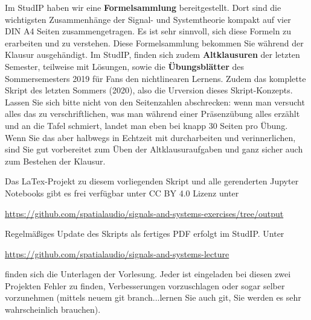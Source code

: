 Im StudIP haben wir eine \textbf{Formelsammlung} bereitgestellt. Dort sind die
wichtigsten Zusammenhänge der Signal- und Systemtheorie kompakt auf vier DIN A4
Seiten zusammengetragen. Es ist sehr sinnvoll, sich diese Formeln zu erarbeiten
und zu verstehen. Diese Formelsammlung bekommen Sie während der Klausur ausgehändigt.
%
Im StudIP, finden sich zudem \textbf{Altklausuren} der letzten Semester,
teilweise mit Lösungen, sowie die \textbf{Übungsblätter} des
Sommersemesters 2019 für Fans den nichtlinearen Lernens. Zudem das komplette Skript des letzten Sommers (2020), also die Urversion dieses Skript-Konzepts.
Lassen Sie sich bitte nicht von den Seitenzahlen abschrecken: wenn man versucht
alles das zu verschriftlichen, was man während einer Präsenzübung alles erzählt
und an die Tafel schmiert, landet man eben bei knapp 30 Seiten pro Übung.
Wenn Sie das aber halbwegs in Echtzeit mit durcharbeiten und verinnerlichen,
sind Sie gut vorbereitet zum Üben der Altklausuraufgaben und ganz sicher auch zum Bestehen der Klausur.

Das LaTex-Projekt zu diesem vorliegenden Skript und alle gerenderten Jupyter Notebooks gibt es frei verfügbar unter CC BY 4.0 Lizenz unter
\begin{mdframed}[backgroundcolor=C2!10]
\url{https://github.com/spatialaudio/signals-and-systems-exercises/tree/output}
\end{mdframed}
%
Regelmäßiges Update des Skripts als fertiges PDF erfolgt im StudIP.
%
Unter
\begin{mdframed}[backgroundcolor=C2!10]
\url{https://github.com/spatialaudio/signals-and-systems-lecture}
\end{mdframed}
finden sich die Unterlagen der Vorlesung.
%
Jeder ist eingeladen bei diesen zwei Projekten Fehler zu finden, Verbesserungen
vorzuschlagen oder sogar selber vorzunehmen (mittels neuem git branch...lernen Sie auch git, Sie werden es sehr wahrscheinlich brauchen).
%
%


\newpage
